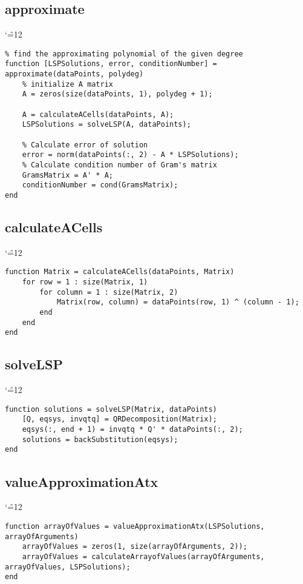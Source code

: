 \documentclass[12pt]{report}
\newenvironment{simplechar}{%
   \catcode`\^=12
}{}
\begin{document}
\subsection{approximate}
\begin{simplechar}
\begin{lstlisting}
% find the approximating polynomial of the given degree
function [LSPSolutions, error, conditionNumber] = approximate(dataPoints, polydeg)
    % initialize A matrix
    A = zeros(size(dataPoints, 1), polydeg + 1);

    A = calculateACells(dataPoints, A);
    LSPSolutions = solveLSP(A, dataPoints);

    % Calculate error of solution
    error = norm(dataPoints(:, 2) - A * LSPSolutions);
    % Calculate condition number of Gram's matrix
    GramsMatrix = A' * A;
    conditionNumber = cond(GramsMatrix);
end
\end{lstlisting}
\end{simplechar}

\subsection{calculateACells}
\begin{simplechar}
\begin{lstlisting}
function Matrix = calculateACells(dataPoints, Matrix)
    for row = 1 : size(Matrix, 1)
        for column = 1 : size(Matrix, 2)
            Matrix(row, column) = dataPoints(row, 1) ^ (column - 1);
        end
    end
end
\end{lstlisting}
\end{simplechar}

\subsection{solveLSP}
\begin{simplechar}
\begin{lstlisting}
function solutions = solveLSP(Matrix, dataPoints)
    [Q, eqsys, invqtq] = QRDecomposition(Matrix);
    eqsys(:, end + 1) = invqtq * Q' * dataPoints(:, 2);
    solutions = backSubstitution(eqsys);
end
\end{lstlisting}
\end{simplechar}

\subsection{valueApproximationAtx}
\begin{simplechar}
\begin{lstlisting}
function arrayOfValues = valueApproximationAtx(LSPSolutions, arrayOfArguments)
    arrayOfValues = zeros(1, size(arrayOfArguments, 2));
    arrayOfValues = calculateArrayofValues(arrayOfArguments, arrayOfValues, LSPSolutions);
end
\end{lstlisting}
\end{simplechar}
\end{document}
